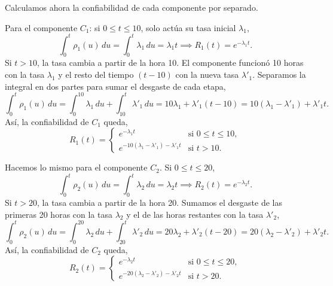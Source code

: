 \documentclass[main.tex]{subfiles}%
\begin{document}
\vspace{2mm}
Calculamos ahora la confiabilidad de cada componente por separado.

Para el componente $C_1$: si $0 \le t \le 10$, solo actúa su tasa inicial $\lambda_1$,
\begin{equation*}
    \int_0^t \rho_1(u)\,du = \int_0^t \lambda_1\,du = \lambda_1 t \implies R_1(t) = e^{-\lambda_1 t}.
\end{equation*}
Si $t > 10$, la tasa cambia a partir de la hora 10. El componente funcionó 10 horas con la tasa $\lambda_1$ y el resto del tiempo $(t - 10)$ con la nueva tasa $\lambda'_1$. Separamos la integral en dos partes para sumar el desgaste de cada etapa,
\begin{equation*}
    \int_0^t \rho_1(u)\,du = \int_0^{10} \lambda_1\,du + \int_{10}^t \lambda'_1\,du = 10\lambda_1 + \lambda'_1(t - 10) = 10(\lambda_1 - \lambda'_1) + \lambda'_1 t.
\end{equation*}
Así, la confiabilidad de $C_1$ queda,
\begin{equation*}
    R_1(t) = \begin{cases}
        e^{-\lambda_1 t} & \text{si } 0 \le t \le 10, \\[2mm]
        e^{-10(\lambda_1 - \lambda'_1) - \lambda'_1 t} & \text{si } t > 10.
    \end{cases}
\end{equation*}

Hacemos lo mismo para el componente $C_2$. Si $0 \le t \le 20$,
\begin{equation*}
    \int_0^t \rho_2(u)\,du = \int_0^t \lambda_2\,du = \lambda_2 t \implies R_2(t) = e^{-\lambda_2 t}.
\end{equation*}
Si $t > 20$, la tasa cambia a partir de la hora 20. Sumamos el desgaste de las primeras 20 horas con la tasa $\lambda_2$ y el de las horas restantes con la tasa $\lambda'_2$,
\begin{equation*}
    \int_0^t \rho_2(u)\,du = \int_0^{20} \lambda_2\,du + \int_{20}^t \lambda'_2\,du = 20\lambda_2 + \lambda'_2(t - 20) = 20(\lambda_2 - \lambda'_2) + \lambda'_2 t.
\end{equation*}
Así, la confiabilidad de $C_2$ queda,
\begin{equation*}
    R_2(t) = \begin{cases}
        e^{-\lambda_2 t} & \text{si } 0 \le t \le 20, \\[2mm]
        e^{-20(\lambda_2 - \lambda'_2) - \lambda'_2 t} & \text{si } t > 20.
    \end{cases}
\end{equation*}
\end{document}
